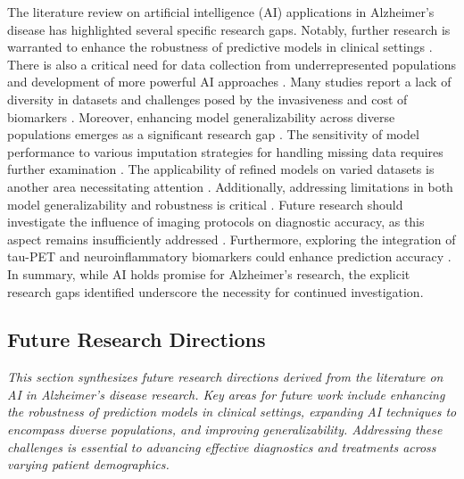 \documentclass{MITcsail}
\begin{document}
The literature review on artificial intelligence (AI) applications in Alzheimer's disease has highlighted several specific research gaps. Notably, further research is warranted to enhance the robustness of predictive models in clinical settings \citep{ref_10_1016_j_neuroimage_2020_117203}. There is also a critical need for data collection from underrepresented populations and development of more powerful AI approaches \citep{ref_10_1002_alz_13390}. Many studies report a lack of diversity in datasets and challenges posed by the invasiveness and cost of biomarkers \citep{ref_10_1002_alz_13390}. Moreover, enhancing model generalizability across diverse populations emerges as a significant research gap \citep{ref_10_1016_s2589_7500_22_00169_8}. The sensitivity of model performance to various imputation strategies for handling missing data requires further examination \citep{ref_10_1016_j_neuroimage_2020_117203}. The applicability of refined models on varied datasets is another area necessitating attention \citep{ref_10_1016_j_mri_2021_02_001}. Additionally, addressing limitations in both model generalizability and robustness is critical \citep{ref_10_1016_j_ejrad_2023_110934}. Future research should investigate the influence of imaging protocols on diagnostic accuracy, as this aspect remains insufficiently addressed \citep{ref_10_1038_s41598_020_79243_9}. Furthermore, exploring the integration of tau-PET and neuroinflammatory biomarkers could enhance prediction accuracy \citep{ref_10_1002_alz_12032}. In summary, while AI holds promise for Alzheimer’s research, the explicit research gaps identified underscore the necessity for continued investigation.

\subsection{Future Research Directions}

\textit{This section synthesizes future research directions derived from the literature on AI in Alzheimer's disease research. Key areas for future work include enhancing the robustness of prediction models in clinical settings, expanding AI techniques to encompass diverse populations, and improving generalizability. Addressing these challenges is essential to advancing effective diagnostics and treatments across varying patient demographics.}
\end{document}
